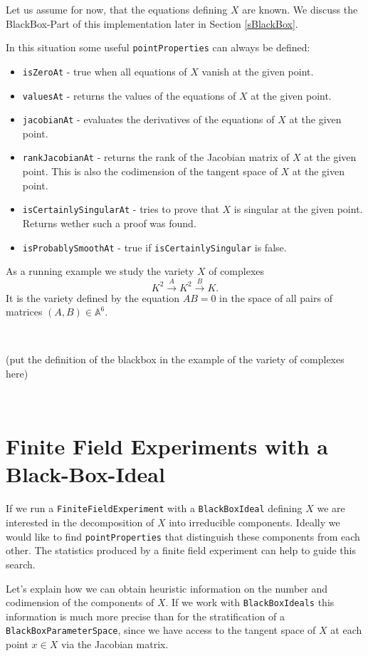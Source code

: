 \documentclass[12pt,a4paper]{amsart}
\theoremstyle{plain}
\theoremstyle{definition}
\renewcommand{\AA}{\mathbb A}
\begin{document}
Let us assume for now, that the equations defining $X$ are known. We discuss the BlackBox-Part of this implementation later in Section \ref{sBlackBox}.

In this situation some useful {\tt pointProperties} can always be defined: 

\begin{itemize}
\item {\tt isZeroAt} - true when all equations of $X$ vanish at the given point.
\item {\tt valuesAt} - returns the values of the equations of $X$ at the given point.
\item {\tt jacobianAt} - evaluates the derivatives of the equations of $X$ at the given point.
\item {\tt rankJacobianAt} - returns the rank of the Jacobian matrix of $X$ at the given point. This is also the codimension of the tangent space of $X$ at the given point.
\item {\tt isCertainlySingularAt} - tries to prove that $X$ is singular at the given point. Returns wether such a proof was found.
\item {\tt isProbablySmoothAt} - true if {\tt isCertainlySingular} is false. 
\end{itemize}

As a running example we study the variety $X$ of complexes
\[
	K^2 \xrightarrow{A} K^2 \xrightarrow{B} K.
\]
It is the variety defined by the equation $AB = 0$ in the space of all pairs of matrices $(A,B) \in \AA^6$.

\

{\color{red} (put the definition of the blackbox in the example of the variety of complexes here)}

\



\section{Finite Field Experiments with a Black-Box-Ideal}

If we run a {\tt FiniteFieldExperiment} with a {\tt BlackBoxIdeal}  defining $X$ we are interested in the decomposition of $X$ into irreducible components. Ideally we would like to find {\tt pointProperties} that distinguish these components from each other. The statistics produced by a finite field experiment can help to guide this search. 

Let's explain how we can obtain heuristic information on the number and codimension of the components of $X$. If we work with {\tt BlackBoxIdeals} this information is much more precise than for the stratification of a {\tt BlackBox\-ParameterSpace}, since we have access to the tangent space of $X$ at each point $x \in X$ via the Jacobian matrix. 
\end{document}
